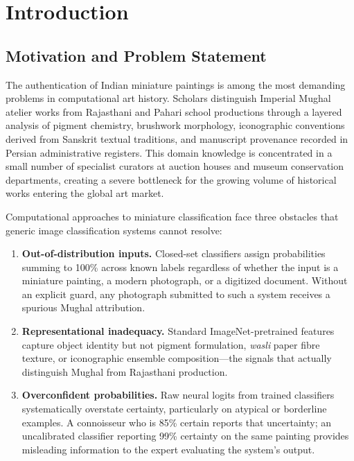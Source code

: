 \documentclass[12pt, a4paper, twoside]{article}
\begin{document}
\clearpage
\tableofcontents

\clearpage
\listoffigures

\clearpage
\listoftables

\clearpage
{}
\setcounter{page}{1}

\section{Introduction}
\label{sec:intro}

\subsection{Motivation and Problem Statement}

The authentication of Indian miniature paintings is among the most demanding problems in computational art history. Scholars distinguish Imperial Mughal atelier works from Rajasthani and Pahari school productions through a layered analysis of pigment chemistry, brushwork morphology, iconographic conventions derived from Sanskrit textual traditions, and manuscript provenance recorded in Persian administrative registers. This domain knowledge is concentrated in a small number of specialist curators at auction houses and museum conservation departments, creating a severe bottleneck for the growing volume of historical works entering the global art market.

Computational approaches to miniature classification face three obstacles that generic image classification systems cannot resolve:

\begin{enumerate}
  \item \textbf{Out-of-distribution inputs.} Closed-set classifiers assign probabilities summing to 100\% across known labels regardless of whether the input is a miniature painting, a modern photograph, or a digitized document. Without an explicit guard, any photograph submitted to such a system receives a spurious Mughal attribution.
  \item \textbf{Representational inadequacy.} Standard ImageNet-pretrained features capture object identity but not pigment formulation, \textit{wasli} paper fibre texture, or iconographic ensemble composition—the signals that actually distinguish Mughal from Rajasthani production.
  \item \textbf{Overconfident probabilities.} Raw neural logits from trained classifiers systematically overstate certainty, particularly on atypical or borderline examples. A connoisseur who is 85\% certain reports that uncertainty; an uncalibrated classifier reporting 99\% certainty on the same painting provides misleading information to the expert evaluating the system's output.
\end{enumerate}
\end{document}
